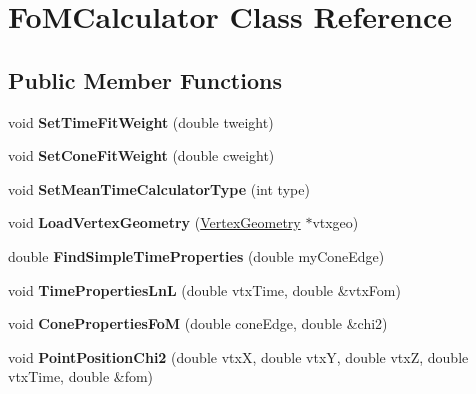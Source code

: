 \hypertarget{classFoMCalculator}{
\section{FoMCalculator Class Reference}
\label{classFoMCalculator}
}
\subsection*{Public Member Functions}
\begin{DoxyCompactItemize}
\item 
\hypertarget{classFoMCalculator_a08e7a4cf1cbdeca75bde8d3c783eb543}{
void {\bfseries SetTimeFitWeight} (double tweight)}
\label{classFoMCalculator_a08e7a4cf1cbdeca75bde8d3c783eb543}

\item 
\hypertarget{classFoMCalculator_a7b70fa75561ef8047f4851e3572bea88}{
void {\bfseries SetConeFitWeight} (double cweight)}
\label{classFoMCalculator_a7b70fa75561ef8047f4851e3572bea88}

\item 
\hypertarget{classFoMCalculator_a410023f27226ff81d1c1f0c6d20d8121}{
void {\bfseries SetMeanTimeCalculatorType} (int type)}
\label{classFoMCalculator_a410023f27226ff81d1c1f0c6d20d8121}

\item 
\hypertarget{classFoMCalculator_aa6a0ef5f03186fc3722f785104199abd}{
void {\bfseries LoadVertexGeometry} (\hyperlink{classVertexGeometry}{VertexGeometry} $\ast$vtxgeo)}
\label{classFoMCalculator_aa6a0ef5f03186fc3722f785104199abd}

\item 
\hypertarget{classFoMCalculator_afc907bb278a95071410be7d0337253a1}{
double {\bfseries FindSimpleTimeProperties} (double myConeEdge)}
\label{classFoMCalculator_afc907bb278a95071410be7d0337253a1}

\item 
\hypertarget{classFoMCalculator_ad62643573ab780bf3329d0c48f615c7a}{
void {\bfseries TimePropertiesLnL} (double vtxTime, double \&vtxFom)}
\label{classFoMCalculator_ad62643573ab780bf3329d0c48f615c7a}

\item 
\hypertarget{classFoMCalculator_a8697cdce3d92b4c8afb843b4e20ae0cd}{
void {\bfseries ConePropertiesFoM} (double coneEdge, double \&chi2)}
\label{classFoMCalculator_a8697cdce3d92b4c8afb843b4e20ae0cd}

\item 
\hypertarget{classFoMCalculator_a14d1020216db6fc5149b7918e8138b0b}{
void {\bfseries PointPositionChi2} (double vtxX, double vtxY, double vtxZ, double vtxTime, double \&fom)}
\label{classFoMCalculator_a14d1020216db6fc5149b7918e8138b0b}


\end{DoxyCompactItemize}
